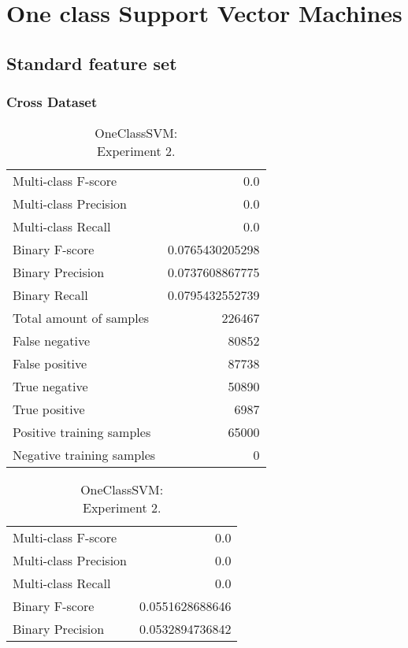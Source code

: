 
\chapter{One class Support Vector Machines} %

\section{Standard feature set}
\subsection{Cross Dataset}

\begin{table}[H]
\begin{minipage}{0.5\textwidth}
\caption{OneClassSVM: \\Experiment 1.}
\centering
\begin{tabular}{l r}
\toprule
Multi-class F-score & 0.0 \\
Multi-class Precision & 0.0 \\
Multi-class Recall & 0.0 \\
\midrule
Binary F-score & 0.0765430205298 \\
Binary Precision & 0.0737608867775 \\
Binary Recall & 0.0795432552739 \\
\midrule
Total amount of samples & 226467 \\
False negative & 80852 \\
False positive & 87738 \\
True negative & 50890 \\
True positive & 6987 \\
\midrule
Positive training samples & 65000 \\
Negative training samples & 0 \\
\bottomrule
\end{tabular}
\end{minipage}
\hfillx
\begin{minipage}{0.5\textwidth}
\caption{OneClassSVM: \\Experiment 2.}
\centering
\begin{tabular}{l r}
\toprule
Multi-class F-score & 0.0 \\
Multi-class Precision & 0.0 \\
Multi-class Recall & 0.0 \\
\midrule
Binary F-score & 0.0551628688646 \\
Binary Precision & 0.0532894736842 \\

\end{tabular}
\end{minipage}
\end{table}
